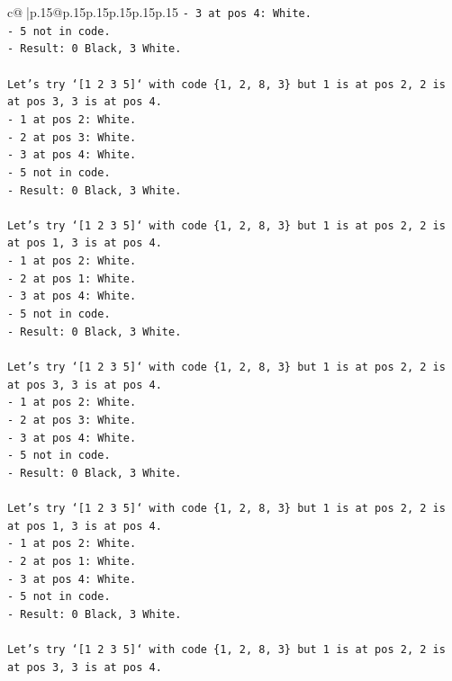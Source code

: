 \documentclass{article}
\begin{document}
{\begin{supertabular}{c@{$\;$}|p{.15\linewidth}@{}p{.15\linewidth}p{.15\linewidth}p{.15\linewidth}p{.15\linewidth}p{.15\linewidth}}
{{{\texttt{{-} 3 at pos 4: White.} \\
\texttt{{-} 5 not in code.} \\
\texttt{{-} Result: 0 Black, 3 White.} \\
\\ 
\texttt{Let's try `{[}1 2 3 5{]}` with code \{1, 2, 8, 3\} but 1 is at pos 2, 2 is at pos 3, 3 is at pos 4.} \\
\texttt{{-} 1 at pos 2: White.} \\
\texttt{{-} 2 at pos 3: White.} \\
\texttt{{-} 3 at pos 4: White.} \\
\texttt{{-} 5 not in code.} \\
\texttt{{-} Result: 0 Black, 3 White.} \\
\\ 
\texttt{Let's try `{[}1 2 3 5{]}` with code \{1, 2, 8, 3\} but 1 is at pos 2, 2 is at pos 1, 3 is at pos 4.} \\
\texttt{{-} 1 at pos 2: White.} \\
\texttt{{-} 2 at pos 1: White.} \\
\texttt{{-} 3 at pos 4: White.} \\
\texttt{{-} 5 not in code.} \\
\texttt{{-} Result: 0 Black, 3 White.} \\
\\ 
\texttt{Let's try `{[}1 2 3 5{]}` with code \{1, 2, 8, 3\} but 1 is at pos 2, 2 is at pos 3, 3 is at pos 4.} \\
\texttt{{-} 1 at pos 2: White.} \\
\texttt{{-} 2 at pos 3: White.} \\
\texttt{{-} 3 at pos 4: White.} \\
\texttt{{-} 5 not in code.} \\
\texttt{{-} Result: 0 Black, 3 White.} \\
\\ 
\texttt{Let's try `{[}1 2 3 5{]}` with code \{1, 2, 8, 3\} but 1 is at pos 2, 2 is at pos 1, 3 is at pos 4.} \\
\texttt{{-} 1 at pos 2: White.} \\
\texttt{{-} 2 at pos 1: White.} \\
\texttt{{-} 3 at pos 4: White.} \\
\texttt{{-} 5 not in code.} \\
\texttt{{-} Result: 0 Black, 3 White.} \\
\\ 
\texttt{Let's try `{[}1 2 3 5{]}` with code \{1, 2, 8, 3\} but 1 is at pos 2, 2 is at pos 3, 3 is at pos 4.} \\
}}}
\end{supertabular}}
\end{document}
